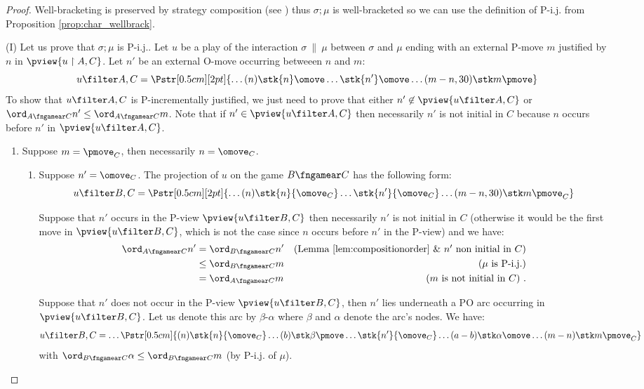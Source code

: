 \begin{proof}
Well-bracketing is preserved by strategy composition (see \cite[Proposition 2.5]{abramsky94full}) thus
$\sigma ; \mu$ is well-bracketed so we can use the definition of P-i.j. from Proposition \ref{prop:char_wellbrack}.

\noindent (I) Let us prove that $\sigma ; \mu$ is P-i.j..
Let $u$ be a play of the interaction $\sigma\ \|\ \mu$ between $\sigma$ and $\mu$
ending with an external P-move $m$
justified by $n$ in $\pview{u \upharpoonright A , C}$.
Let $n'$ be an external O-move occurring betweeen $n$ and $m$:
$$ u \filter A,C =  
\Pstr[0.5cm][2pt]{ \ldots (n){\stk {n} \omove}  \ldots
 {\stk {n'} \omove}  \ldots  (m-n,30){\stk m \pmove}
}
$$
To show that $u \filter A,C$ is P-incrementally justified, we just need to prove that either $n'\not\in \pview{u \filter A,C}$ or $\ord_{A\fngamear C} n' \leq \ord_{A\fngamear C} m$. 
Note that if $n'\in \pview{u \filter A,C}$ 
then necessarily $n'$ is not initial 
in $C$ because $n$ occurs before $n'$ in
$\pview{u \filter A,C}$.

\begin{enumerate}[1)]
\item \label{case:mC}
Suppose $m =\pmove_C$, then necessarily $n=\omove_C$.

\begin{enumerate}
\item \label{case:mCnpC} Suppose $n' = \omove_C$. The projection of $u$ on the game $B\fngamear C$ has the following form:
$$ u \filter B,C =  
\Pstr[0.5cm][2pt]{ \ldots (n){\stk {n} {\omove_C}}  \ldots
 {\stk {n'}{\omove_C}}  \ldots  (m-n,30){\stk m {\pmove_C}}
}$$

Suppose that $n'$ occurs in the P-view $\pview{u\filter B,C}$ then necessarily $n'$ is not initial 
in $C$ (otherwise it would be the first move in
$\pview{u \filter B,C}$, which is not the case since $n$ occurs before $n'$ in the P-view) and we have:
\begin{align*}
\ord_{A\fngamear C} n' 
& = \ord_{B\fngamear C} n' & \mbox{(Lemma \ref{lem:compositionorder} \& $n'$ non initial in $C$)} \\
& \leq \ord_{B\fngamear C} m & \mbox{($\mu$ is P-i.j.)} \\
& = \ord_{A\fngamear C} m & \mbox{($m$ is not initial in $C$)} \ .
\end{align*}

Suppose that $n'$ does not occur in the P-view $\pview{u \filter B,C}$, then $n'$ lies underneath a PO arc occurring in $\pview{u \filter B,C}$. Let us denote this arc by $\beta$-$\alpha$ where $\beta$ and $\alpha$ denote the arc's nodes. We have:
$$ u \filter B,C = \ldots  
\Pstr[0.5cm]{
 (n){\stk{n} {\omove_C} } \ldots (b){\stk\beta \pmove} \ldots \stk{n'} {\omove_C}
\ldots (a-b){\stk\alpha \omove}  \ldots (m-n){\stk m {\pmove_C} }
} $$
with $\ord_{B\fngamear C} \alpha \leq \ord_{B\fngamear C} m$ (by P-i.j. of $\mu$).
  

\end{enumerate}
\end{enumerate}
\end{proof}
